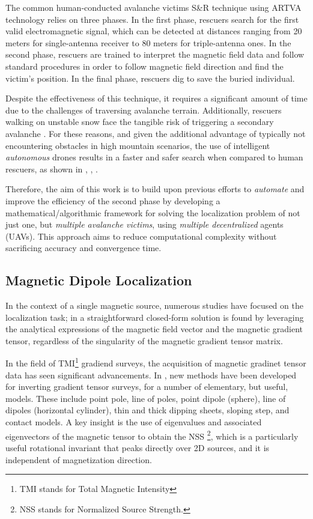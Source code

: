 The common human-conducted avalanche victims S\&R technique using ARTVA 
technology relies on three phases. In the first phase, rescuers search for the 
first valid electromagnetic signal, which can be detected at distances ranging 
from 20 meters for single-antenna receiver to 80 meters for triple-antenna ones. 
In the second phase, rescuers are trained to interpret the magnetic field data 
and follow standard procedures in order to follow magnetic field direction and 
find the victim's position. In the final phase, rescuers dig to save the buried 
individual.

Despite the effectiveness of this technique, it requires a significant amount of 
time due to the challenges of traversing avalanche terrain. Additionally, 
rescuers walking on unstable snow face the tangible risk of triggering a 
secondary avalanche \cite{first-model}. For these reasons, and given the 
additional advantage of typically not encountering obstacles in high mountain 
scenarios, the use of intelligent \textit{autonomous} drones results in a faster 
and safer search when compared to human rescuers, as shown in \cite{sr}, 
\cite{sr2}, \cite{sr3}.

Therefore, the aim of this work is to build upon previous efforts to 
\textit{automate} and improve the efficiency of the second phase by developing a 
mathematical/algorithmic framework for solving the localization problem of not 
just one, but \textit{multiple avalanche victims}, using \textit{multiple 
decentralized} agents (UAVs). This approach aims to reduce computational 
complexity without sacrificing accuracy and convergence time.

\subsection{Magnetic Dipole Localization}
In the context of a single magnetic source, numerous studies have focused 
on the localization task; in \cite{single_closed_formula_position} 
a straightforward closed-form solution is found by leveraging the analytical 
expressions of the magnetic field vector and the magnetic gradient tensor, 
regardless of the singularity of the magnetic gradient tensor matrix.

In the field of TMI\footnote{TMI stands for Total Magnetic Intensity} 
gradiend surveys, the acquisition of magnetic gradinet tensor data 
has seen significant advancements.
In \cite{NSS_analysis2}, new methods have been 
developed for inverting gradient tensor surveys, 
for a number of elementary, but useful, models. 
These include point pole, line 
of poles, point dipole (sphere), line of dipoles (horizontal cylinder), thin and thick 
dipping sheets, sloping step, and contact models.
A key insight is the use of eigenvalues and associated eigenvectors of the magnetic
tensor to obtain the NSS \footnote{NSS stands for Normalized Source Strength.},
which is a particularly useful rotational invariant that peaks 
directly over 2D sources, and it is independent of magnetization 
direction.

